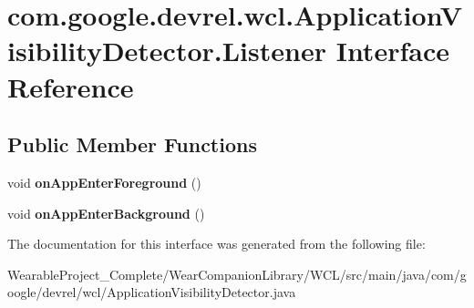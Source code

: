 \hypertarget{interfacecom_1_1google_1_1devrel_1_1wcl_1_1ApplicationVisibilityDetector_1_1Listener}{}\section{com.\+google.\+devrel.\+wcl.\+Application\+Visibility\+Detector.\+Listener Interface Reference}
\label{interfacecom_1_1google_1_1devrel_1_1wcl_1_1ApplicationVisibilityDetector_1_1Listener}
\subsection*{Public Member Functions}
\begin{DoxyCompactItemize}
\item 
void {\bfseries on\+App\+Enter\+Foreground} ()\hypertarget{interfacecom_1_1google_1_1devrel_1_1wcl_1_1ApplicationVisibilityDetector_1_1Listener_afa800366d1e6af7b13f8592dcc627111}{}\label{interfacecom_1_1google_1_1devrel_1_1wcl_1_1ApplicationVisibilityDetector_1_1Listener_afa800366d1e6af7b13f8592dcc627111}

\item 
void {\bfseries on\+App\+Enter\+Background} ()\hypertarget{interfacecom_1_1google_1_1devrel_1_1wcl_1_1ApplicationVisibilityDetector_1_1Listener_a49dc49a7b7c243438b8e205255284d03}{}\label{interfacecom_1_1google_1_1devrel_1_1wcl_1_1ApplicationVisibilityDetector_1_1Listener_a49dc49a7b7c243438b8e205255284d03}

\end{DoxyCompactItemize}


The documentation for this interface was generated from the following file\+:\begin{DoxyCompactItemize}
\item 
Wearable\+Project\+\_\+\+Complete/\+Wear\+Companion\+Library/\+W\+C\+L/src/main/java/com/google/devrel/wcl/Application\+Visibility\+Detector.\+java\end{DoxyCompactItemize}
